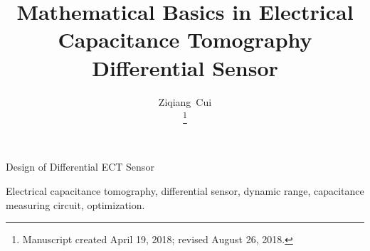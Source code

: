 \documentclass[journal]{IEEEtran}
\begin{document}
%
\title{Mathematical Basics in  Electrical Capacitance Tomography Differential Sensor}
%
%
%

\author{Ziqiang~Cui

\thanks{Manuscript created April 19, 2018; revised August 26, 2018.}}



%
{Design of Differential ECT Sensor}

\maketitle



\begin{IEEEkeywords}
Electrical capacitance tomography, differential sensor, dynamic range, capacitance measuring circuit, optimization.
\end{IEEEkeywords}



















\end{document}
